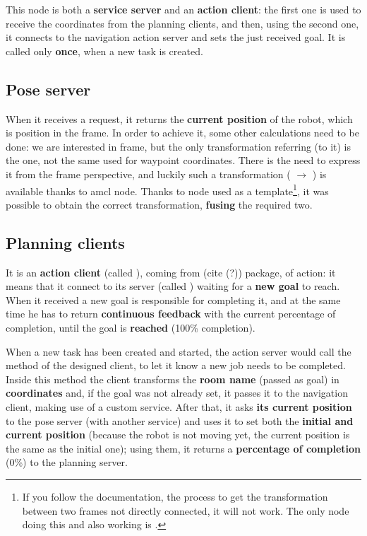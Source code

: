 This node is both a \textbf{service server} and an \textbf{action client}: the first one is used to receive the coordinates from the planning clients, and then, using the second one, it connects to the navigation action server and sets the just received goal. It is called only \textbf{once}, when a new task is created.

\subsection{Pose server}
\label{sub:pose}

When it receives a request, it returns the \textbf{current position} of the robot, which is  position in the  frame. In order to achieve it, some other calculations need to be done: we are interested in  frame, but the only transformation referring (to it) is the  one, not the same used for waypoint coordinates. There is the need to express it from the  frame perspective, and luckily such a transformation ( $\rightarrow$ ) is available thanks to \acrshort{amcl} node. 
Thanks to  node \cite{tfexample} used as a template\footnote{If you follow the documentation, the process to get the transformation between two frames not directly connected, it will not work. The only node doing this and also working is .}, it was possible to obtain the correct transformation, \textbf{fusing} the required two.

\subsection{Planning clients}


It is an \textbf{action client} (called ), coming from  (cite (?)) package, of  action: it means that it connect to its server (called ) waiting for a \textbf{new goal} to reach. When it received a new goal is responsible for completing it, and at the same time he has to return \textbf{continuous feedback
} with the current percentage of completion, until the goal is \textbf{reached} (100\% completion).

When a new task has been created and started, the action server would call the  method of the designed client, to let it know a new job needs to be completed.
Inside this method the client transforms the \textbf{room name} (passed as goal) in \textbf{coordinates} and, if the goal was not already set, it passes it to the navigation client, making use of a custom service. After that, it asks \textbf{its current position} to the pose server (with another service) and uses it to set both the \textbf{initial and current position} (because the robot is not moving yet, the current position is the same as the initial one); using them, it returns a \textbf{percentage of completion} (0\%) to the planning server.

